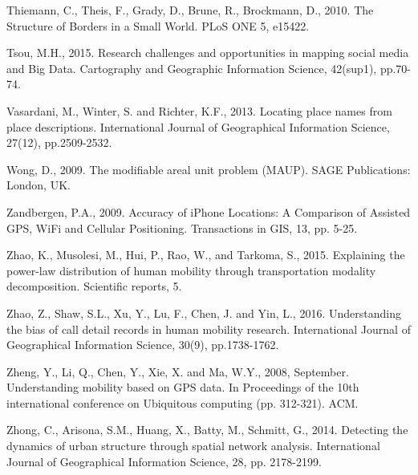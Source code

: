 \documentclass[]{tGIS2e}
\begin{document}
\begin{thebibliography}{9}
Thiemann, C., Theis, F., Grady, D., Brune, R., Brockmann, D., 2010. The Structure of Borders in a Small World. PLoS ONE 5, e15422.

Tsou, M.H., 2015. Research challenges and opportunities in mapping social media and Big Data. Cartography and Geographic Information Science, 42(sup1), pp.70-74.

Vasardani, M., Winter, S. and Richter, K.F., 2013. Locating place names from place descriptions. International Journal of Geographical Information Science, 27(12), pp.2509-2532.

Wong, D., 2009. The modifiable areal unit problem (MAUP). SAGE Publications: London, UK.

Zandbergen, P.A., 2009. Accuracy of iPhone Locations: A Comparison of Assisted GPS, WiFi and Cellular Positioning. Transactions in GIS, 13, pp. 5-25.

Zhao, K., Musolesi, M., Hui, P., Rao, W., and Tarkoma, S., 2015. Explaining the power-law distribution of human mobility through transportation modality decomposition. Scientific reports, 5.

Zhao, Z., Shaw, S.L., Xu, Y., Lu, F., Chen, J. and Yin, L., 2016. Understanding the bias of call detail records in human mobility research. International Journal of Geographical Information Science, 30(9), pp.1738-1762.

Zheng, Y., Li, Q., Chen, Y., Xie, X. and Ma, W.Y., 2008, September. Understanding mobility based on GPS data. In Proceedings of the 10th international conference on Ubiquitous computing (pp. 312-321). ACM.

Zhong, C., Arisona, S.M., Huang, X., Batty, M., Schmitt, G., 2014. Detecting the dynamics of urban structure through spatial network analysis. International Journal of Geographical Information Science, 28, pp. 2178-2199.

\end{thebibliography}


%




\label{lastpage}
\end{document}

